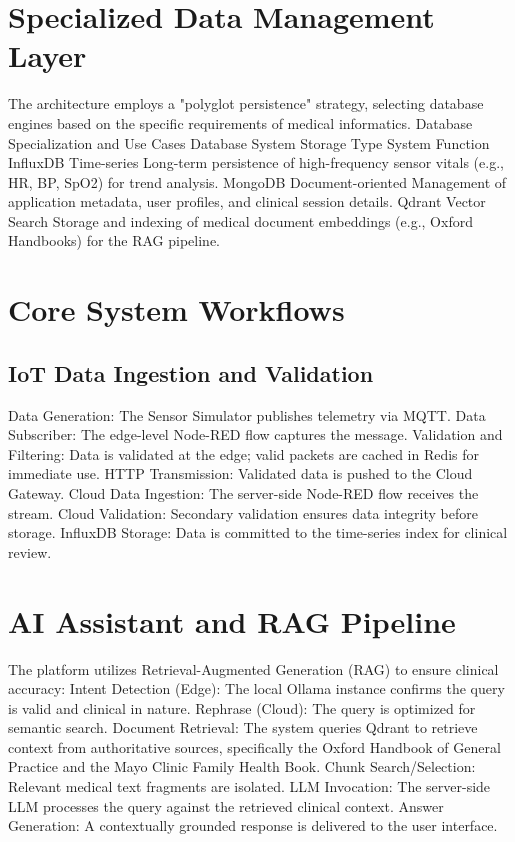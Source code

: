 \documentclass[runningheads]{llncs}
\begin{document}
\section{Specialized Data Management Layer}
The architecture employs a "polyglot persistence" strategy, selecting database engines based on the specific requirements of medical informatics.
Database Specialization and Use Cases
Database System
Storage Type
System Function
InfluxDB
Time-series
Long-term persistence of high-frequency sensor vitals (e.g., HR, BP, SpO2) for trend analysis.
MongoDB
Document-oriented
Management of application metadata, user profiles, and clinical session details.
Qdrant
Vector Search
Storage and indexing of medical document embeddings (e.g., Oxford Handbooks) for the RAG pipeline.
\section{Core System Workflows}
\subsection{IoT Data Ingestion and Validation}
Data Generation: The Sensor Simulator publishes telemetry via MQTT.
Data Subscriber: The edge-level Node-RED flow captures the message.
Validation and Filtering: Data is validated at the edge; valid packets are cached in Redis for immediate use.
HTTP Transmission: Validated data is pushed to the Cloud Gateway.
Cloud Data Ingestion: The server-side Node-RED flow receives the stream.
Cloud Validation: Secondary validation ensures data integrity before storage.
InfluxDB Storage: Data is committed to the time-series index for clinical review.
\section{AI Assistant and RAG Pipeline}
The platform utilizes Retrieval-Augmented Generation (RAG) to ensure clinical accuracy:
Intent Detection (Edge): The local Ollama instance confirms the query is valid and clinical in nature.
Rephrase (Cloud): The query is optimized for semantic search.
Document Retrieval: The system queries Qdrant to retrieve context from authoritative sources, specifically the Oxford Handbook of General Practice and the Mayo Clinic Family Health Book.
Chunk Search/Selection: Relevant medical text fragments are isolated.
LLM Invocation: The server-side LLM processes the query against the retrieved clinical context.
Answer Generation: A contextually grounded response is delivered to the user interface.
\end{document}
